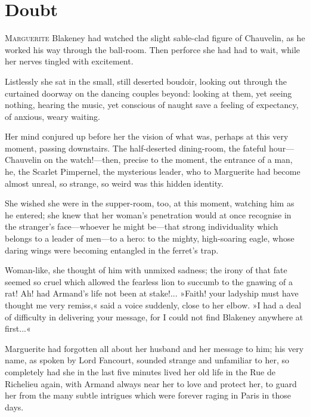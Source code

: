 
\chapter{Doubt}
\lettrine[lines=4]{M}{arguerite} Blakeney had watched the slight sable-clad figure of Chauvelin, as he worked his way through the ball-room. Then perforce she had had to wait, while her nerves tingled with excitement.

Listlessly she sat in the small, still deserted boudoir, looking out through the curtained doorway on the dancing couples beyond: looking at them, yet seeing nothing, hearing the music, yet conscious of naught save a feeling of expectancy, of anxious, weary waiting.

Her mind conjured up before her the vision of what was, perhaps at this very moment, passing downstairs. The half-deserted dining-room, the fateful hour\allowbreak---\allowbreak Chauvelin on the watch!\allowbreak---\allowbreak then, precise to the moment, the entrance of a man, he, the Scarlet Pimpernel, the mysterious leader, who to Marguerite had become almost unreal, so strange, so weird was this hidden identity.

She wished she were in the supper-room, too, at this moment, watching him as he entered; she knew that her woman's penetration would at once recognise in the  stranger's face\allowbreak---\allowbreak whoever he might be\allowbreak---\allowbreak that strong individuality which belongs to a leader of men\allowbreak---\allowbreak to a hero: to the mighty, high-soaring eagle, whose daring wings were becoming entangled in the ferret's trap.

Woman-like, she thought of him with unmixed sadness; the irony of that fate seemed so cruel which allowed the fearless lion to succumb to the gnawing of a rat! Ah! had Armand's life not been at stake!... »Faith! your ladyship must have thought me very remiss,« said a voice suddenly, close to her elbow. »I had a deal of difficulty in delivering your message, for I could not find Blakeney anywhere at first...«

Marguerite had forgotten all about her husband and her message to him; his very name, as spoken by Lord Fancourt, sounded strange and unfamiliar to her, so completely had she in the last five minutes lived her old life in the Rue de Richelieu again, with Armand always near her to love and protect her, to guard her from the many subtle intrigues which were forever raging in Paris in those days.

